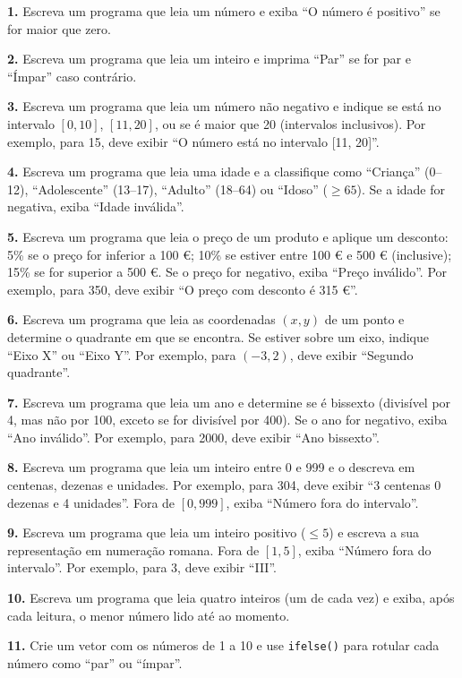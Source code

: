 \documentclass[
  portuguese,
  11pt,
  openany]{book}
\begin{document}
\textbf{1.} Escreva um programa que leia um número e exiba ``O número é positivo'' se for
maior que zero.

\textbf{2.} Escreva um programa que leia um inteiro e imprima ``Par'' se for par e
``Ímpar'' caso contrário.

\textbf{3.} Escreva um programa que leia um número não negativo e indique se está no
intervalo \([0, 10]\), \([11, 20]\), ou se é maior que 20 (intervalos inclusivos).
Por exemplo, para 15, deve exibir ``O número está no intervalo {[}11, 20{]}''.

\textbf{4.} Escreva um programa que leia uma idade e a classifique como ``Criança''
(0--12), ``Adolescente'' (13--17), ``Adulto'' (18--64) ou ``Idoso'' (\(\geq 65\)). Se a idade for
negativa, exiba ``Idade inválida''.

\textbf{5.} Escreva um programa que leia o preço de um produto e aplique um desconto:
5\% se o preço for inferior a 100 €; 10\% se estiver entre 100 € e 500 €
(inclusive); 15\% se for superior a 500 €. Se o preço for negativo, exiba ``Preço
inválido''. Por exemplo, para 350, deve exibir ``O preço com desconto é 315 €''.

\textbf{6.} Escreva um programa que leia as coordenadas \((x, y)\) de um ponto e
determine o quadrante em que se encontra. Se estiver sobre um eixo, indique ``Eixo
X'' ou ``Eixo Y''. Por exemplo, para \((-3, 2)\), deve exibir ``Segundo quadrante''.

\textbf{7.} Escreva um programa que leia um ano e determine se é bissexto (divisível
por 4, mas não por 100, exceto se for divisível por 400). Se o ano for negativo,
exiba ``Ano inválido''. Por exemplo, para 2000, deve exibir ``Ano bissexto''.

\textbf{8.} Escreva um programa que leia um inteiro entre 0 e 999 e o descreva em
centenas, dezenas e unidades. Por exemplo, para 304, deve exibir ``3 centenas 0
dezenas e 4 unidades''. Fora de \([0, 999]\), exiba ``Número fora do intervalo''.

\textbf{9.} Escreva um programa que leia um inteiro positivo (\(\leq 5\)) e escreva a sua
representação em numeração romana. Fora de \([1, 5]\), exiba ``Número fora do
intervalo''. Por exemplo, para 3, deve exibir ``III''.

\textbf{10.} Escreva um programa que leia quatro inteiros (um de cada vez) e exiba,
após cada leitura, o menor número lido até ao momento.

\textbf{11.} Crie um vetor com os números de 1 a 10 e use \texttt{ifelse()} para rotular cada
número como ``par'' ou ``ímpar''.
\end{document}
